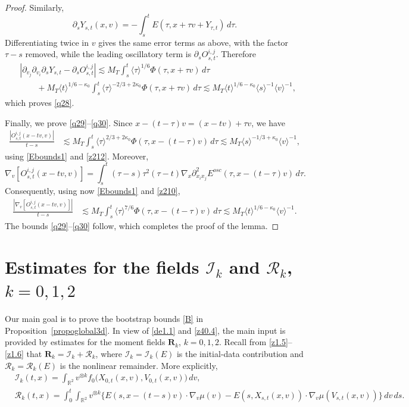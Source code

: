 \documentclass[reqno,11pt]{amsart}
\numberwithin{equation}{section}
\begin{document}
\begin{proof}
Similarly,
\[
	\partial_sY_{s,t}(x,v)
	=-\int_s^tE(\tau,x+\tau v+Y_{\tau,t})\,d\tau.
\]
Differentiating twice in $v$ gives the same error terms as above,
with the factor $\tau-s$ removed, while the leading oscillatory term
is $\partial_sO_{s,t}^{i,j}$. Therefore
\begin{align*}
	&\left|\partial_{v_j}\partial_{v_i}\partial_sY_{s,t}
	-\partial_sO_{s,t}^{i,j}\right|
	\lesssim M_T\int_s^t\langle\tau\rangle^{1/6}
	\Phi(\tau,x+\tau v)\,d\tau\\
	&\qquad+M_T\langle t\rangle^{1/6-\kappa_0}
	\int_s^t\langle\tau\rangle^{-2/3+2\kappa_0}\Phi(\tau,x+\tau v)\,d\tau\lesssim
	M_T\langle t\rangle^{1/6-\kappa_0}
	\langle s\rangle^{-1}\langle v\rangle^{-1},
\end{align*}
which proves \eqref{q28}.

Finally, we prove \eqref{q29}--\eqref{q30}. Since $x-(t-\tau)v=(x-tv)+\tau v$, we have
\begin{align*}
	\frac{|O_{s,t}^{i,j}(x-tv,v)|}{t-s}&\lesssim
	M_T\int_s^t\langle\tau\rangle^{2/3+2\kappa_0}
	\Phi(\tau,x-(t-\tau)v)\,d\tau\lesssim M_T\langle s\rangle^{-1/3+\kappa_0}\langle v\rangle^{-1},
\end{align*}
using \eqref{Ebounds1} and \eqref{z212}. Moreover,
\[
	\nabla_v\!\left[O_{s,t}^{i,j}(x-tv,v)\right]=\int_s^t(\tau-s)\tau^2(\tau-t)\nabla_x\partial_{x_ix_j}^2E^{osc}(\tau,x-(t-\tau)v)\,d\tau.
\]
Consequently, using now \eqref{Ebounds1} and \eqref{z210},
\begin{align*}
	\frac{
	\left|\nabla_v[O_{s,t}^{i,j}(x-tv,v)]\right|}{t-s}&\lesssim M_T\int_s^t\langle\tau\rangle^{7/6}
	\Phi(\tau,x-(t-\tau)v)\,d\tau\lesssim M_T\langle t\rangle^{1/6-\kappa_0}\langle v\rangle^{-1}.
\end{align*}
The bounds \eqref{q29}--\eqref{q30} follow, which completes the proof of the lemma.
\end{proof}

\section{Estimates for the fields $\mathcal{I}_k$ and $\mathcal{R}_k$, $k=0,1,2$}
	
	Our main goal is to prove the bootstrap bounds \eqref{B} in
Proposition~\ref{propoglobal3d}. In view of \eqref{de1.1} and
\eqref{z40.4}, the main input is provided by estimates for the moment
fields $\mathbf R_k$, $k=0,1,2$. Recall from
\eqref{z1.5}--\eqref{z1.6} that $\mathbf R_k=\mathcal I_k+\mathcal R_k$, 
where $\mathcal I_k=\mathcal I_k(E)$ is the initial-data contribution
and $\mathcal R_k=\mathcal R_k(E)$ is the nonlinear remainder. More
explicitly,
\begin{equation}\label{sec5eq1}
\begin{split}
&\mathcal{I}_k(t,x)
=\int_{\mathbb{R}^2}v^{\otimes k}
f_0\bigl(X_{0,t}(x,v),V_{0,t}(x,v)\bigr)\,dv,\\
&\mathcal{R}_k(t,x)
=\int_0^t\int_{\mathbb{R}^2}v^{\otimes k}
\bigl\{
E(s,x-(t-s)v)\cdot\nabla_v\mu(v)
-E(s,X_{s,t}(x,v))\cdot\nabla_v\mu(V_{s,t}(x,v))
\bigr\}\,dv\,ds.
\end{split}
\end{equation}
\end{document}
